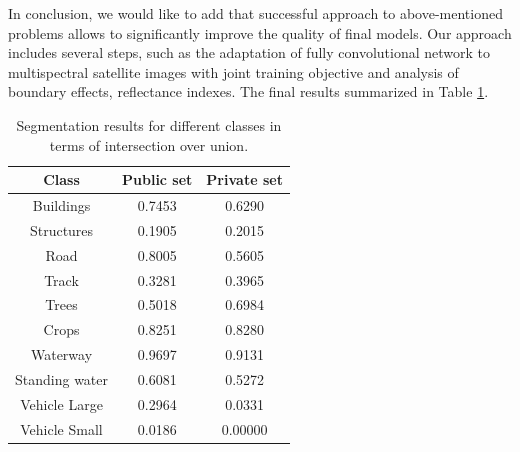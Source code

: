 \documentclass[10pt,twocolumn,letterpaper]{article}
\begin{document}
In conclusion, we would like to add that successful approach to above-mentioned problems allows to significantly improve the quality of final models. Our approach includes several steps, such as the adaptation of fully convolutional network to multispectral satellite images with joint training objective and analysis of boundary effects, reflectance indexes. The final results summarized in Table \ref{tab:results}.

\begin{table}[h]
	\begin{center}

	\begin{tabular}{c|c|c}
\textbf{Class}    & \textbf{Public set} & \textbf{Private set} \\ \hline \hline
Buildings  & 0.7453 & 0.6290 \\ 
Structures & 0.1905 & 0.2015 \\
Road  & 0.8005 & 0.5605 \\ 
Track & 0.3281 & 0.3965 \\ 
Trees & 0.5018 & 0.6984 \\ 
Crops & 0.8251 & 0.8280 \\ 
Waterway & 0.9697 & 0.9131 \\ 
Standing water & 0.6081 & 0.5272 \\ 
Vehicle Large & 0.2964 & 0.0331 \\ 
Vehicle Small & 0.0186 & 0.00000 \\ 
		\end{tabular}
	\end{center}
	\captionsetup{justification=centering}
	\caption{Segmentation results for different classes in terms of intersection over union.}\label{tab:results}	
\end{table}

\newpage
\end{document}
